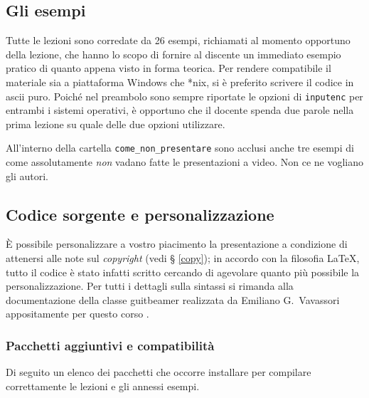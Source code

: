 \documentclass[a4paper,12pt]{article}
\begin{document}
\subsection{Gli esempi}
Tutte le lezioni sono corredate da 26 esempi, richiamati al momento
opportuno della lezione, che hanno lo scopo di fornire al discente un
immediato esempio pratico di quanto appena visto in forma teorica. Per
rendere compatibile il materiale sia a piattaforma Windows che *nix,
si \`e preferito scrivere il codice in ascii puro. Poich\'e nel
preambolo sono sempre riportate le opzioni di \texttt{inputenc} per
entrambi i sistemi operativi, \`e opportuno che il docente spenda due
parole nella prima lezione su quale delle due opzioni utilizzare. 

All'interno della cartella \texttt{come\_non\_presentare} sono acclusi
anche tre esempi di come assolutamente \textit{non} vadano fatte le
presentazioni a video. Non ce ne vogliano gli autori.

\subsection{Codice sorgente e personalizzazione}
\`E possibile personalizzare a vostro piacimento la presentazione a
condizione di attenersi alle note sul \textit{copyright} (vedi \S
\ref{copy}); in accordo con la filosofia \LaTeX, tutto il codice \`e
stato infatti scritto cercando di agevolare quanto pi\`u possibile la
personalizzazione. Per tutti i dettagli sulla sintassi si rimanda alla
documentazione della classe \textsf{guitbeamer} realizzata da Emiliano
G.~Vavassori appositamente per questo corso \cite{EVG}.

\subsubsection{Pacchetti aggiuntivi e compatibilit\`a}
Di seguito un elenco dei pacchetti che occorre installare per
compilare correttamente le lezioni e gli annessi esempi.
\end{document}
